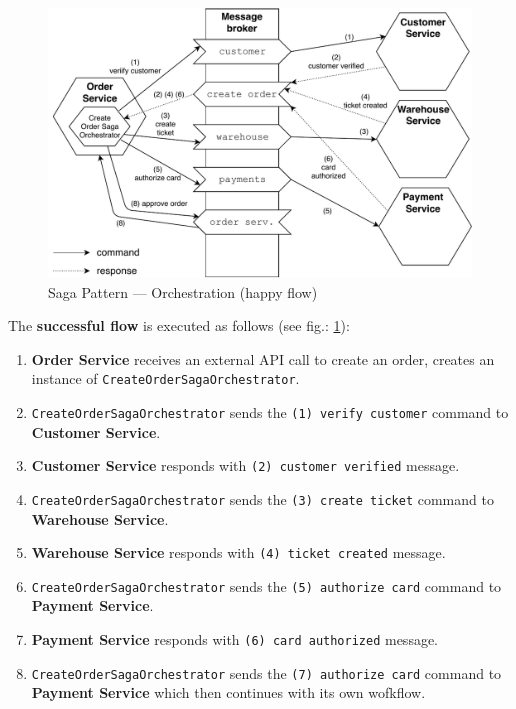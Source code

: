 \documentclass[thesis=M,english,hidelinks]{FITthesis}[2012/10/20]
\begin{document}
\begin{figure}[!ht]
  \centering
    \includegraphics[width=1\textwidth]{images/saga-orch-happy.pdf}
    \caption{Saga Pattern --- Orchestration (happy flow)}
    \label{fig:saga-orch-happy}
\end{figure}

The \textbf{successful flow} is executed as follows (see fig.: \ref{fig:saga-orch-happy}):
\begin{enumerate}
    \item \textbf{Order Service} receives an external \acrshort{API} call to create an order, creates an instance of \texttt{CreateOrderSagaOrchestrator}.
    \item \texttt{CreateOrderSagaOrchestrator} sends the \texttt{(1) verify customer} command to \textbf{Customer Service}.
    \item \textbf{Customer Service} responds with \texttt{(2) customer verified} message.
    \item \texttt{CreateOrderSagaOrchestrator} sends the \texttt{(3) create ticket} command to \textbf{Warehouse Service}.
    \item \textbf{Warehouse Service} responds with \texttt{(4) ticket created} message.
    \item \texttt{CreateOrderSagaOrchestrator} sends the \texttt{(5) authorize card} command to \textbf{Payment Service}.
    \item \textbf{Payment Service} responds with \texttt{(6) card authorized} message.
    \item \texttt{CreateOrderSagaOrchestrator} sends the \texttt{(7) authorize card} command to \textbf{Payment Service} which then continues with its own wofkflow.
\end{enumerate}
\end{document}
